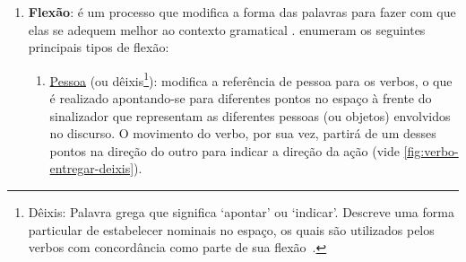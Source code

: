 \begin{enumerate}
\begin{enumerate}

    \end{enumerate}


    \item \textbf{Flexão}: é um processo que modifica a forma das palavras para fazer com que elas se adequem melhor ao contexto gramatical \cite{hill-2019-sign-languages}.  enumeram os seguintes principais tipos de flexão:
    




    \begin{enumerate}
        \item \underline{Pessoa} (ou dêixis\footnote{
            Dêixis: Palavra grega que significa `apontar' ou `indicar'. Descreve uma forma particular de estabelecer nominais no espaço, os quais são utilizados pelos verbos com concordância como parte de sua flexão~\cite{quadros-2004-estudos-linguisticos}.
        }): modifica a referência de pessoa para os verbos, o que é realizado apontando-se para diferentes pontos no espaço à frente do sinalizador que representam as diferentes pessoas (ou objetos) envolvidos no discurso. O movimento do verbo, por sua vez, partirá de um desses pontos na direção do outro para indicar a direção da ação (vide \autoref{fig:verbo-entregar-deixis}).
        


\end{enumerate}
\end{enumerate}

